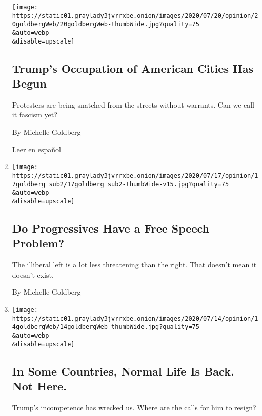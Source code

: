 \begin{enumerate}
  \texttt{[image: https://static01.graylady3jvrrxbe.onion/images/2020/07/20/opinion/20goldbergWeb/20goldbergWeb-thumbWide.jpg?quality=75\\\&auto=webp\\\&disable=upscale]}

  \hypertarget{trumps-occupation-of-american-cities-has-begun}{%
  \subsection{Trump's Occupation of American Cities Has
  Begun}\label{trumps-occupation-of-american-cities-has-begun}}

  Protesters are being snatched from the streets without warrants. Can
  we call it fascism yet?

  By Michelle Goldberg

  \href{https://www.nytimes3xbfgragh.onion/es/2020/07/22/espanol/opinion/portland-protestas-trump.html}{Leer
  en español}
\item
  \href{/2020/07/17/opinion/sunday/harpers-letter-free-speech.html}{}

  \texttt{[image: https://static01.graylady3jvrrxbe.onion/images/2020/07/17/opinion/17goldberg\_sub2/17goldberg\_sub2-thumbWide-v15.jpg?quality=75\\\&auto=webp\\\&disable=upscale]}

  \hypertarget{do-progressives-have-a-free-speech-problem}{%
  \subsection{Do Progressives Have a Free Speech
  Problem?}\label{do-progressives-have-a-free-speech-problem}}

  The illiberal left is a lot less threatening than the right. That
  doesn't mean it doesn't exist.

  By Michelle Goldberg
\item
  \href{/2020/07/13/opinion/us-coronavirus-trump.html}{}

  \texttt{[image: https://static01.graylady3jvrrxbe.onion/images/2020/07/14/opinion/14goldbergWeb/14goldbergWeb-thumbWide.jpg?quality=75\\\&auto=webp\\\&disable=upscale]}

  \hypertarget{in-some-countries-normal-life-is-back-not-here}{%
  \subsection{In Some Countries, Normal Life Is Back. Not
  Here.}\label{in-some-countries-normal-life-is-back-not-here}}

  Trump's incompetence has wrecked us. Where are the calls for him to
  resign?


\end{enumerate}
